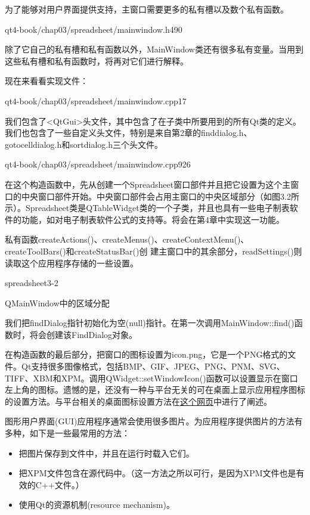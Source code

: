 \documentclass[11pt,oneside]{book}
\begin{document}
\begin{common-format}
为了能够对用户界面提供支持，主窗口需要更多的私有槽以及数个私有函数。
\begin{cppline}{qt4-book/chap03/spreadsheet/mainwindow.h}{49}{0}
\end{cppline}

除了它自己的私有槽和私有函数以外，MainWindow类还有很多私有变量。当用到这些私有槽和私有函数时，将再对它们进行解释。

现在来看看实现文件：
\begin{cppline}{qt4-book/chap03/spreadsheet/mainwindow.cpp}{1}{7}
\end{cppline}

我们包含了<QtGui>头文件，其中包含了在子类中所要用到的所有Qt类的定义。我们也包含了一些自定义头文件，特别是来自第2章的finddialog.h、gotocelldialog.h和sortdialog.h三个头文件。
\begin{cppline}{qt4-book/chap03/spreadsheet/mainwindow.cpp}{9}{26}
\end{cppline}

在这个构造函数中，先从创建一个Spreadsheet窗口部件并且把它设置为这个主窗口的中央窗口部件开始。中央窗口部件会占用主窗口的中央区域部分（如图3.2所示）。Spreadsheet类是QTableWidget类的一个子类，并且也具有一些电子制表软件的功能，如对电子制表软件公式的支持等。将会在第4章中实现这一功能。

私有函数createActions()、createMenus()、createContextMenu()、createToolBars()和createStatusBar()创
建主窗口中的其余部分，readSettings()则读取这个应用程序存储的一些设置。
\begin{linefig}[0.8]{spreadsheet3-2}
\caption{QMainWindow中的区域分配}
\label{fig:spreadsheet3-2}
\end{linefig}

我们把findDialog指针初始化为空(null)指针。在第一次调用MainWindow::find()函数时，将会创建该FindDialog对象。

在构造函数的最后部分，把窗口的图标设置为icon.png，它是一个PNG格式的文件。Qt支持很多图像格式，包括BMP、GIF、JPEG、PNG、PNM、SVG、TIFF、XBM和XPM。调用QWidget::setWindowIcon()函数可以设置显示在窗口左上角的图标。遗憾的是，还没有一种与平台无关的可在桌面上显示应用程序图标的设置方法。与平台相关的桌面图标设置方法在\href{http://doc.trolltech.com/4.3/appicon.html}{这个网页}中进行了阐述。


图形用户界面(GUI)应用程序通常会使用很多图片。为应用程序提供图片的方法有多种，如下是一些最常用的方法：
\begin{itemize}
\item 把图片保存到文件中，并且在运行时载入它们。
\item 把XPM文件包含在源代码中。（这一方法之所以可行，是因为XPM文件也是有效的C++文件。）
\item 使用Qt的资源机制(resource mechanism)。
\end{itemize}


\end{common-format}
\end{document}
